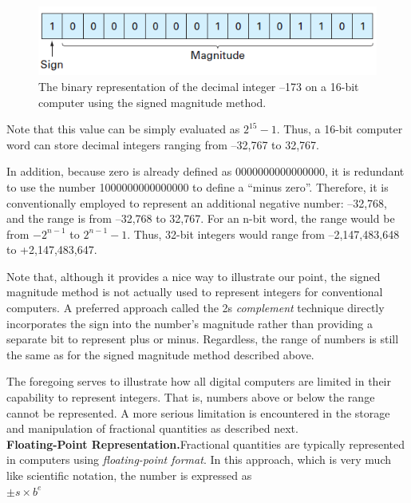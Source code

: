 \documentclass[../main.tex]{subfiles}
\begin{document}
\begin{figure}[h]
    \includegraphics{./images/fig_4_3}
    \caption{The binary representation of the decimal integer –173 on a 16-bit computer using the signed
    magnitude method.}
\end{figure}

\noindent
Note that this value can be simply evaluated as $2^{15}-1$. Thus, a 16-bit computer word can
store decimal integers ranging from --32,767 to 32,767.

In addition, because zero is already defined as 0000000000000000, it is redundant
to use the number 1000000000000000 to define a ``minus zero''. Therefore, it is conventionally
employed to represent an additional negative number: --32,768, and the range is
from --32,768 to 32,767. For an n-bit word, the range would be from  $-2^{n-1}$ to $2^{n-1}-1$.
Thus, 32-bit integers would range from --2,147,483,648 to +2,147,483,647.

Note that, although it provides a nice way to illustrate our point, the signed magnitude
method is not actually used to represent integers for conventional computers. A preferred
approach called the 2s \emph{complement} technique directly incorporates the sign into the
number's magnitude rather than providing a separate bit to represent plus or minus.
Regardless, the range of numbers is still the same as for the signed magnitude method
described above.

The foregoing serves to illustrate how all digital computers are limited in their capability
to represent integers. That is, numbers above or below the range cannot be represented. A
more serious limitation is encountered in the storage and manipulation of fractional quantities
as described next.\\

\noindent
\textbf{Floating-Point Representation.}\quad Fractional quantities are typically represented in computers
using \emph{floating-point format}. In this approach, which is very much like scientific
notation, the number is expressed as\\

$\pm s\times b^e$\\
\end{document}
